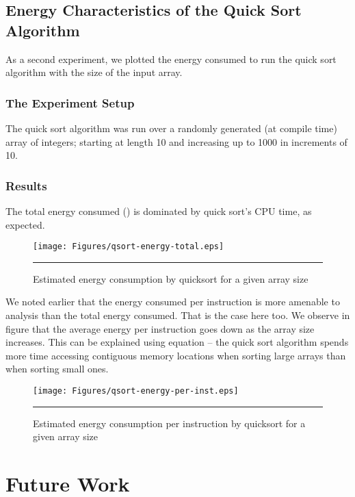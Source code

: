 \subsection{Energy Characteristics of the Quick Sort Algorithm}

As a second experiment, we plotted the energy consumed to run the
quick sort algorithm with the size of the input array.

\subsubsection{The Experiment Setup}

The quick sort algorithm was run over a randomly generated (at compile
time) array of integers; starting at length 10 and increasing up to
1000 in increments of 10.

\subsubsection{Results}

The total energy consumed ()
is dominated by quick sort's CPU time, as expected.

\begin{figure}[hp]
  \centering
  \texttt{[image: Figures/qsort-energy-total.eps]}
  \rule{35em}{0.5pt}
  \caption{Estimated energy consumption by quicksort for a given array size}
  \label{fig:qsort-energy-per-array-length}
\end{figure}

We noted earlier that the energy consumed per instruction is more
amenable to analysis than the total energy consumed.  That is the case
here too.  We observe in figure
 that the average
energy per instruction goes down as the array size increases.  This
can be explained using equation  -- the quick sort
algorithm spends more time accessing contiguous memory locations when
sorting large arrays than when sorting small ones.

\begin{figure}[hp]
  \centering
  \texttt{[image: Figures/qsort-energy-per-inst.eps]}
  \rule{35em}{0.5pt}
  \caption{Estimated energy consumption per instruction by quicksort
    for a given array size}
  \label{fig:qsort-energy-per-inst-per-array-length}
\end{figure}

\section{Future Work}

